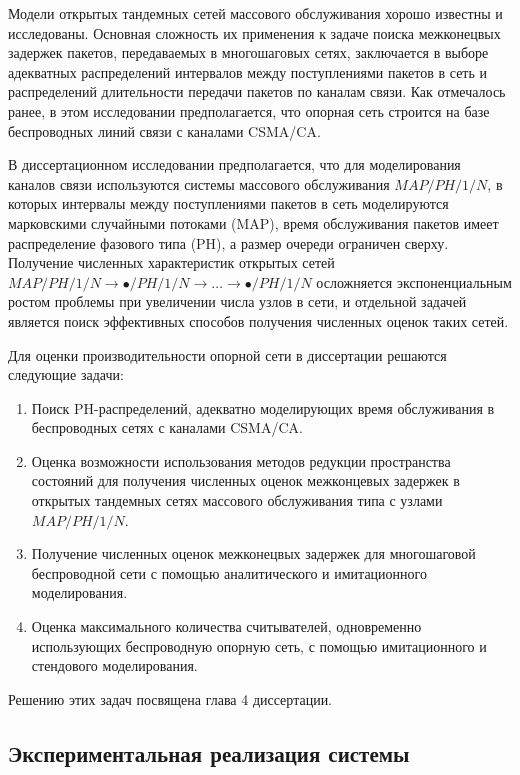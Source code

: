 Модели открытых тандемных сетей массового обслуживания хорошо известны и исследованы. Основная сложность их применения к задаче поиска межконецвых задержек пакетов, передаваемых в многошаговых сетях, заключается в выборе адекватных распределений интервалов между поступлениями пакетов в сеть и распределений длительности передачи пакетов по каналам связи. Как отмечалось ранее, в этом исследовании предполагается, что опорная сеть строится на базе беспроводных линий связи с каналами CSMA/CA.

В диссертационном исследовании предполагается, что для моделирования каналов связи используются системы массового обслуживания $MAP/PH/1/N$, в которых интервалы между поступлениями пакетов в сеть моделируются марковскими случайными потоками (MAP), время обслуживания пакетов имеет распределение фазового типа (PH), а размер очереди ограничен сверху. Получение численных характеристик открытых сетей $MAP/PH/1/N \rightarrow \bullet/PH/1/N \rightarrow \dots \rightarrow \bullet/PH/1/N$ осложняется экспоненциальным ростом проблемы при увеличении числа узлов в сети, и отдельной задачей является поиск эффективных способов получения численных оценок таких сетей.

Для оценки производительности опорной сети в диссертации решаются следующие задачи:

\begin{enumerate}
    \item Поиск PH-распределений, адекватно моделирующих время обслуживания в беспроводных сетях с каналами CSMA/CA.
    \item Оценка возможности использования методов редукции пространства состояний для получения численных оценок межконцевых задержек в открытых тандемных сетях массового обслуживания типа с узлами $MAP/PH/1/N$.
    \item Получение численных оценок межконецвых задержек для многошаговой беспроводной сети с помощью аналитического и имитационного моделирования.
    \item Оценка максимального количества считывателей, одновременно использующих беспроводную опорную сеть, с помощью имитационного и стендового моделирования.
\end{enumerate}

Решению этих задач посвящена глава 4 диссертации.


\subsection{Экспериментальная реализация системы}

